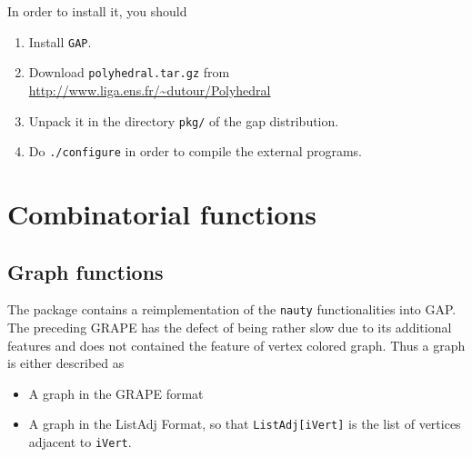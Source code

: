 \documentclass[12pt]{amsart}
\begin{document}
In order to install it, you should
\begin{enumerate}
\item Install {\tt GAP}.
\item Download {\tt polyhedral.tar.gz} from 
{\url{http://www.liga.ens.fr/~dutour/Polyhedral}}
\item Unpack it in the directory {\tt pkg/} of the gap distribution.
\item Do {\tt ./configure} in order to compile the external programs.
\end{enumerate}





\section{Combinatorial functions}

\subsection{Graph functions}
The package contains a reimplementation of the {\tt nauty} \cite{nauty} functionalities
into GAP.
The preceding GRAPE has the defect of being rather slow due to its additional
features and does not contained the feature of vertex colored graph.
Thus a graph is either described as
\begin{itemize}
\item A graph in the GRAPE format
\item A graph in the ListAdj Format, so that {\tt ListAdj[iVert]} is the list of vertices adjacent to {\tt iVert}.
\end{itemize}
\end{document}

